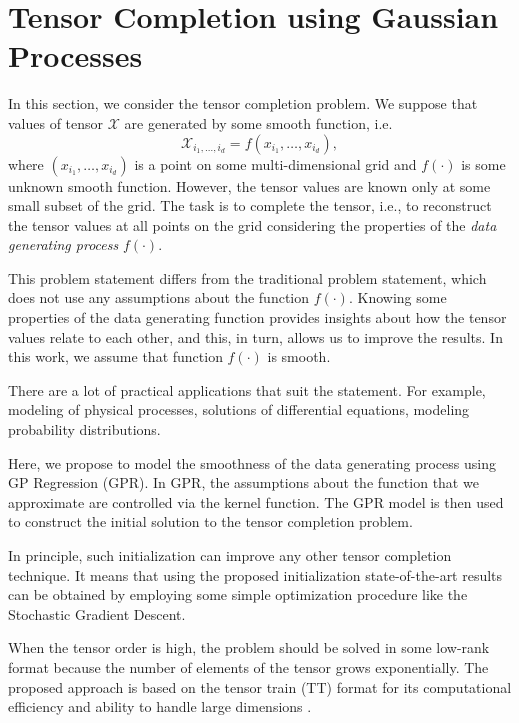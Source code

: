 \section{Tensor Completion using Gaussian Processes}
\label{sec:tensor_completion_using_gp}

In this section, we consider the tensor completion problem.
We suppose that values of tensor $\mathcal{X}$ are generated by some smooth function, i.e.
\[
\mathcal{X}_{i_1, \ldots, i_d} = f(x_{i_1}, \ldots, x_{i_d}),
\]
where $(x_{i_1}, \ldots, x_{i_d})$ is a point on
some multi-dimensional grid and $f(\cdot)$ is some
unknown smooth function.
However, the tensor values are known only at some small subset of the grid.
The task is to complete the tensor, i.e., to reconstruct the tensor values at all points on the grid considering the properties of the {\em data generating process} $f(\cdot)$.

This problem statement differs from the traditional problem statement, which does not use any assumptions about the function $f(\cdot)$.
Knowing some properties of the data generating function provides insights about how the tensor values relate to each other, and this, in turn, allows us to improve the results.
In this work, we assume that function $f(\cdot)$ is smooth.

There are a lot of practical applications that suit the statement.
For example, modeling of physical processes, solutions of differential equations, modeling probability distributions.

Here, we propose to model the smoothness of the data generating process using
GP Regression (GPR).
In GPR, the assumptions about the function that we approximate are controlled via the kernel
function.
The GPR model is then used to construct the initial solution to the tensor completion problem.

In principle, such initialization can improve any other tensor completion technique.
It means that using the proposed initialization state-of-the-art results
can be obtained by employing some simple optimization procedure like the Stochastic Gradient Descent.


When the tensor order is high, the problem should be solved in some low-rank
format because the number of elements of the tensor grows exponentially.
The proposed approach is based on the tensor train (TT) format for its
computational efficiency and ability to handle large dimensions \citep{oseledets2010tt}.

